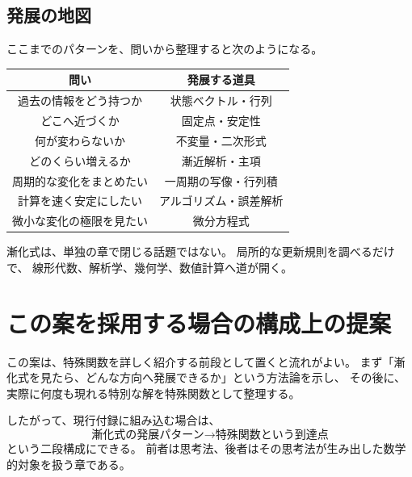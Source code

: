 \subsection{発展の地図}

ここまでのパターンを、問いから整理すると次のようになる。

\begin{center}
\begin{tabular}{c|c}
  問い & 発展する道具\\ \hline
  過去の情報をどう持つか & 状態ベクトル・行列\\
  どこへ近づくか & 固定点・安定性\\
  何が変わらないか & 不変量・二次形式\\
  どのくらい増えるか & 漸近解析・主項\\
  周期的な変化をまとめたい & 一周期の写像・行列積\\
  計算を速く安定にしたい & アルゴリズム・誤差解析\\
  微小な変化の極限を見たい & 微分方程式\\
\end{tabular}
\end{center}

漸化式は、単独の章で閉じる話題ではない。
局所的な更新規則を調べるだけで、
線形代数、解析学、幾何学、数値計算へ道が開く。

\section*{この案を採用する場合の構成上の提案}

この案は、特殊関数を詳しく紹介する前段として置くと流れがよい。
まず「漸化式を見たら、どんな方向へ発展できるか」という方法論を示し、
その後に、実際に何度も現れる特別な解を特殊関数として整理する。

したがって、現行付録に組み込む場合は、
\[
  \text{漸化式の発展パターン}
  \longrightarrow
  \text{特殊関数という到達点}
\]
という二段構成にできる。
前者は思考法、後者はその思考法が生み出した数学的対象を扱う章である。
